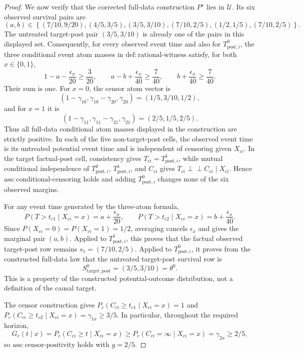 \documentclass{article}
\begin{document}
\begin{proof}
We now verify that the corrected full-data construction \(P^\star\) lies in \(\mathcal U\). Its six observed survival pairs are
\[
(a,b)\in
\left\{(7/10,9/20),(4/5,3/5),(3/5,3/10),
(7/10,2/5),(1/2,1/5),(7/10,2/5)\right\}.
\]
The untreated target-post pair \((3/5,3/10)\) is already one of the pairs in this displayed set. Consequently, for every observed event time and also for \(T^{0}_{\mathrm{post},i}\), the three conditional event atom masses in \(\mathrm{def{:}rational\mbox{-}witness}\) satisfy, for both \(x\in\{0,1\}\),
\[
1-a-\frac{\epsilon_x}{20}\ge\frac3{20},\qquad
a-b+\frac{\epsilon_x}{40}\ge\frac7{40},\qquad
b+\frac{\epsilon_x}{40}\ge\frac7{40}.
\]
Their sum is one. For \(x=0\), the censor atom vector is
\[
(1-\gamma_{10},\gamma_{10}-\gamma_{20},\gamma_{20})
=(1/5,3/10,1/2),
\]
and for \(x=1\) it is
\[
(1-\gamma_{11},\gamma_{11}-\gamma_{21},\gamma_{21})
=(2/5,1/5,2/5).
\]
Thus all full-data conditional atom masses displayed in the construction are strictly positive. In each of the five non-target-post cells, the observed event time is its untreated potential event time and is independent of censoring given \(X_{ci}\). In the target factual-post cell, consistency gives \(T_{ci}=T^{1}_{\mathrm{post},i}\), while mutual conditional independence of \(T^{0}_{\mathrm{post},i}\), \(T^{1}_{\mathrm{post},i}\), and \(C_{ci}\) gives \(T_{ci}\mathbin{\perp\!\!\!\perp}C_{ci}\mid X_{ci}\). Hence \(\mathrm{ass{:}conditional\mbox{-}censoring}\) holds and adding \(T^{0}_{\mathrm{post},i}\) changes none of the six observed margins.

For any event time generated by the three-atom formula,
\[
P(T>t_{c1}\mid X_{ci}=x)=a+\frac{\epsilon_x}{20},
\qquad
P(T>t_{c2}\mid X_{ci}=x)=b+\frac{\epsilon_x}{40}.
\]
Since \(P(X_{ci}=0)=P(X_{ci}=1)=1/2\), averaging cancels \(\epsilon_x\) and gives the marginal pair \((a,b)\). Applied to \(T^{1}_{\mathrm{post},i}\), this proves that the factual observed target-post row remains \(s_1=(7/10,2/5)\). Applied to \(T^{0}_{\mathrm{post},i}\), it proves from the constructed full-data law that the untreated target-post survival row is
\[
S^0_{\mathrm{target,post}}=(3/5,3/10)=\theta^0.
\]
This is a property of the constructed potential-outcome distribution, not a definition of the causal target.

The censor construction gives \(P_c(C_{ci}\ge t_{c1}\mid X_{ci}=x)=1\) and \(P_c(C_{ci}\ge t_{c2}\mid X_{ci}=x)=\gamma_{1x}\ge3/5\). In particular, throughout the required horizon,
\[
G_c(t\mid x)=P_c(C_{ci}\ge t\mid X_{ci}=x)
\ge P_c(C_{ci}=\infty\mid X_{ci}=x)
=\gamma_{2x}\ge2/5,
\]
so \(\mathrm{ass{:}censor\mbox{-}positivity}\) holds with \(g=2/5\).


\end{proof}
\end{document}
